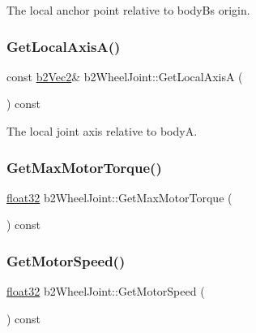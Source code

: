 The local anchor point relative to bodyB\textquotesingle{}s origin. 

\mbox{\label{classb2_wheel_joint_a86bf4dbf356f9095c05d62313810e602}} 
\subsubsection{\texorpdfstring{GetLocalAxisA()}{GetLocalAxisA()}}
{\footnotesize\ttfamily const \mbox{\hyperlink{structb2_vec2}{b2\+Vec2}}\& b2\+Wheel\+Joint\+::\+Get\+Local\+AxisA (\begin{DoxyParamCaption}{ }\end{DoxyParamCaption}) const\hspace{0.3cm}{\ttfamily [inline]}}



The local joint axis relative to bodyA. 

\mbox{\label{classb2_wheel_joint_a8e7dc36e5c59760f2807886d0acd514e}} 
\subsubsection{\texorpdfstring{GetMaxMotorTorque()}{GetMaxMotorTorque()}}
{\footnotesize\ttfamily \mbox{\hyperlink{b2_settings_8h_aacdc525d6f7bddb3ae95d5c311bd06a1}{float32}} b2\+Wheel\+Joint\+::\+Get\+Max\+Motor\+Torque (\begin{DoxyParamCaption}{ }\end{DoxyParamCaption}) const\hspace{0.3cm}{\ttfamily [inline]}}

\mbox{\label{classb2_wheel_joint_a47774ba5dfc1a6a5f15bcc651eea8127}} 
\subsubsection{\texorpdfstring{GetMotorSpeed()}{GetMotorSpeed()}}
{\footnotesize\ttfamily \mbox{\hyperlink{b2_settings_8h_aacdc525d6f7bddb3ae95d5c311bd06a1}{float32}} b2\+Wheel\+Joint\+::\+Get\+Motor\+Speed (\begin{DoxyParamCaption}{ }\end{DoxyParamCaption}) const\hspace{0.3cm}{\ttfamily [inline]}}



